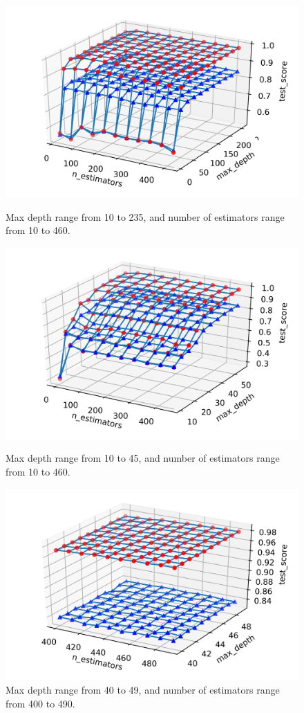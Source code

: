 \documentclass[11pt]{article}
\begin{document}
\begin{figure}[H]
  \includegraphics[width=\linewidth]{hyperparameter_tuning_1}
  \caption{Max depth range from 10 to 235, and number of estimators range from 10 to 460.}
  \label{fig:results_1}
\endminipage\hfill
{}
  \includegraphics[width=\linewidth]{hyperparameter_tuning_2}
  \caption{Max depth range from 10 to 45, and number of estimators range from 10 to 460.}
  \label{fig:results_2}
\endminipage\hfill
{}
  \begin{center}
  \includegraphics[width=0.48\linewidth]{hyperparameter_tuning_3}
  \caption{Max depth range from 40 to 49, and number of estimators range from 400 to 490.}
  \label{fig:results_3}
  \end{center}
\endminipage
\end{figure}
\end{document}
